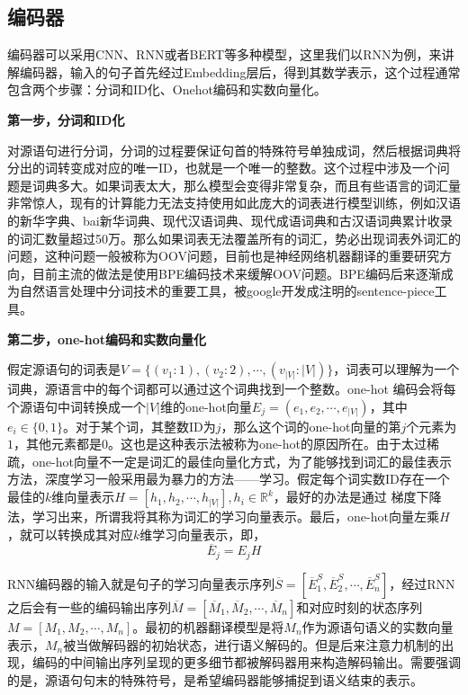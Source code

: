 \documentclass[twoside,a4paper,12pt]{book}%
\begin{document}
\subsection{编码器}
编码器可以采用\gls{CNN}、\gls{RNN}或者\gls{BERT}等多种模型，这里我们以\gls{RNN}为例，来讲解编码器，输入的句子首先经过Embedding层后，得到其数学表示，这个过程通常包含两个步骤：分词和ID化、Onehot编码和实数向量化。

\textbf{第一步，分词和ID化}

对源语句进行分词，分词的过程要保证句首的特殊符号单独成词，然后根据词典将分出的词转变成对应的唯一ID，也就是一个唯一的整数。这个过程中涉及一个问题是词典多大。如果词表太大，那么模型会变得非常复杂，而且有些语言的词汇量非常惊人，现有的计算能力无法支持使用如此庞大的词表进行模型训练，例如汉语的新华字典、bai新华词典、现代汉语词典、现代成语词典和古汉语词典累计收录的词汇数量超过50万。那么如果词表无法覆盖所有的词汇，势必出现词表外词汇的问题，这种问题一般被称为OOV问题，目前也是神经网络机器翻译的重要研究方向，目前主流的做法是使用\gls{BPE}编码技术来缓解OOV问题。\gls{BPE}编码后来逐渐成为自然语言处理中分词技术的重要工具，被google开发成注明的sentence-piece工具。

\textbf{第二步，one-hot编码和实数向量化}

假定源语句的词表是$V=\{(v_1:1),(v_2:2),\cdots,(v_{|V|}:|V|)\}$，词表可以理解为一个词典，源语言中的每个词都可以通过这个词典找到一个整数。one-hot 编码会将每个源语句中词转换成一个$|V|$维的one-hot向量$E_j=(e_1,e_2,\cdots ,e_{|V|})$，其中$e_i\in \{0,1\}$。对于某个词，其整数ID为$j$，那么这个词的one-hot向量的第$j$个元素为$1$，其他元素都是$0$。这也是这种表示法被称为one-hot的原因所在。由于太过稀疏，one-hot向量不一定是词汇的最佳向量化方式，为了能够找到词汇的最佳表示方法，深度学习一般采用最为暴力的方法——学习。假定每个词实数ID存在一个最佳的$k$维向量表示$H=[h_1,h_2,\cdots,h_{|V|}],h_i\in \mathbb{R}^k$，最好的办法是通过
梯度下降法，学习出来，所谓我将其称为词汇的学习向量表示。最后，one-hot向量左乘$H$，就可以转换成其对应$k$维学习向量表示，即，
$$
\overline{E}_j=E_jH
$$

\gls{RNN}编码器的输入就是句子的学习向量表示序列$\overline{S}=[\overline{E}_1^S,\overline{E}_2^S,\cdots,\overline{E}_n^S]$，经过\gls{RNN}之后会有一些的编码输出序列$\overline{M}=[\overline{M}_1,\overline{M}_2,\cdots,\overline{M}_n]$和对应时刻的状态序列$M=[M_1,M_2,\cdots,M_n]$。最初的机器翻译模型是将$M_n$作为源语句语义的实数向量表示，$M_n$被当做解码器的初始状态，进行语义解码的。但是后来注意力机制的出现，编码的中间输出序列呈现的更多细节都被解码器用来构造解码输出。需要强调的是，源语句句末的特殊符号，是希望编码器能够捕捉到语义结束的表示。
\end{document}

